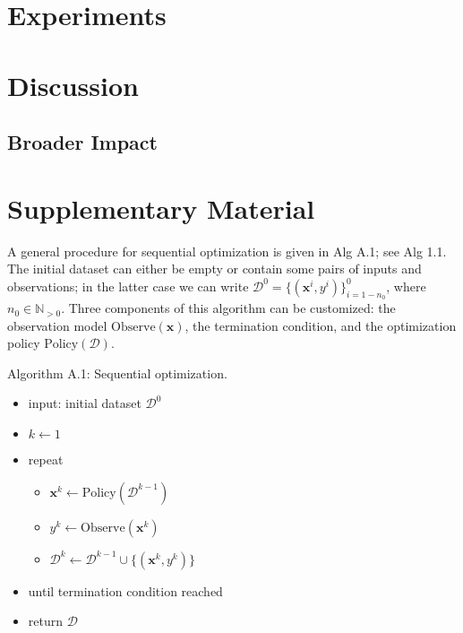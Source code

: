 \documentclass{article}
\begin{document}
\section{Experiments}

\section{Discussion}

\subsection{Broader Impact}


\section{Supplementary Material}

A general procedure for sequential optimization is given in Alg A.1; see
\cite{Garnett2023} Alg 1.1. The initial dataset can either be empty or
contain some pairs of inputs and observations; in the latter case we can
write $\mathcal{D}^0 = \{(\mathbf{x}^i, y^i)\}_{i=1-n_0}^0$, where
$n_0 \in \mathbb{N}_{>0}$. Three components of this algorithm can be
customized: the observation model $\mathrm{Observe}(\mathbf{x})$, the
termination condition, and the optimization policy
$\mathrm{Policy}(\mathcal{D})$.

Algorithm A.1: Sequential optimization.

\begin{itemize}

\item
  input: initial dataset $\mathcal{D}^0$
\item
  $k \gets 1$
\item
  repeat

  \begin{itemize}
  
  \item
    $\mathbf{x}^k \gets \mathrm{Policy}(\mathcal{D}^{k-1})$
  \item
    $y^k \gets \mathrm{Observe}(\mathbf{x}^k)$
  \item
    $\mathcal{D}^k \gets \mathcal{D}^{k-1} \cup \{(\mathbf{x}^k, y^k)\}$
  \end{itemize}
\item
  until termination condition reached
\item
  return $\mathcal{D}$
\end{itemize}
\end{document}
